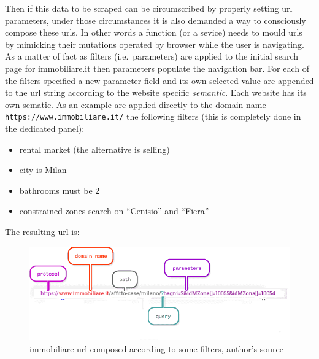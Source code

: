 \documentclass[
  12pt,
  a4paper,
  oneside]{book}
\newcommand{\passthrough}[1]{#1}
\providecommand{\tightlist}{%
  \setlength{\itemsep}{0pt}\setlength{\parskip}{0pt}}
\theoremstyle{definition}
\theoremstyle{definition}
\theoremstyle{definition}
\theoremstyle{remark}
\begin{document}
Then if this data to be scraped can be circumscribed by properly setting url parameters, under those circumstances it is also demanded a way to consciously compose these urls. In other words a function (or a sevice) needs to mould urls by mimicking their mutations operated by browser while the user is navigating. As a matter of fact as filters (i.e.~parameters) are applied to the initial search page for immobiliare.it then parameters populate the navigation bar. For each of the filters specified a new parameter field and its own selected value are appended to the url string according to the website specific \emph{semantic}. Each website has its own sematic.
As an example are applied directly to the domain name \passthrough{\lstinline!https://www.immobiliare.it/!} the following filters (this is completely done in the dedicated panel):

\begin{itemize}
\tightlist
\item
  rental market (the alternative is selling)
\item
  city is Milan
\item
  bathrooms must be 2
\item
  constrained zones search on ``Cenisio'' and ``Fiera''
\end{itemize}

The resulting url is:

\begin{figure}
\centering
\includegraphics{images/immobiliare_url.png}
\caption{\label{fig:urlanatomy}immobiliare url composed according to some filters, author's source}
\end{figure}
\end{document}
